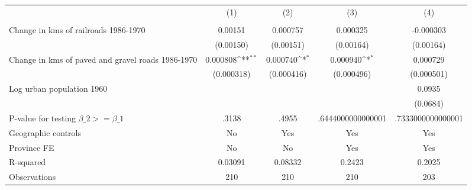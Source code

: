 {
\def\sym#1{\ifmmode^{#1}\else\(^{#1}\)\fi}
\begin{tabular}{l*{4}{c}}
\hline\hline
                &\multicolumn{1}{c}{(1)}&\multicolumn{1}{c}{(2)}&\multicolumn{1}{c}{(3)}&\multicolumn{1}{c}{(4)}\\
                &\multicolumn{1}{c}{}&\multicolumn{1}{c}{}&\multicolumn{1}{c}{}&\multicolumn{1}{c}{}\\
\hline
Change in kms of railroads 1986-1970&  0.00151         & 0.000757         & 0.000325         &-0.000303         \\
                &(0.00150)         &(0.00151)         &(0.00164)         &(0.00164)         \\
[1em]
Change in kms of paved and gravel roads 1986-1970& 0.000808\sym{**} & 0.000740\sym{*}  & 0.000940\sym{*}  & 0.000729         \\
                &(0.000318)         &(0.000416)         &(0.000496)         &(0.000501)         \\
[1em]
Log urban population 1960&                  &                  &                  &   0.0935         \\
                &                  &                  &                  & (0.0684)         \\
\hline
P-value for testing $\beta\_{2} >= \beta\_{1}$&    .3138         &    .4955         &.6444000000000001         &.7333000000000001         \\
Geographic controls&       No         &      Yes         &      Yes         &      Yes         \\
Province FE     &       No         &       No         &      Yes         &      Yes         \\
R-squared       &  0.03091         &  0.08332         &   0.2423         &   0.2025         \\
Observations    &      210         &      210         &      210         &      203         \\
\hline\hline
\end{tabular}
}
